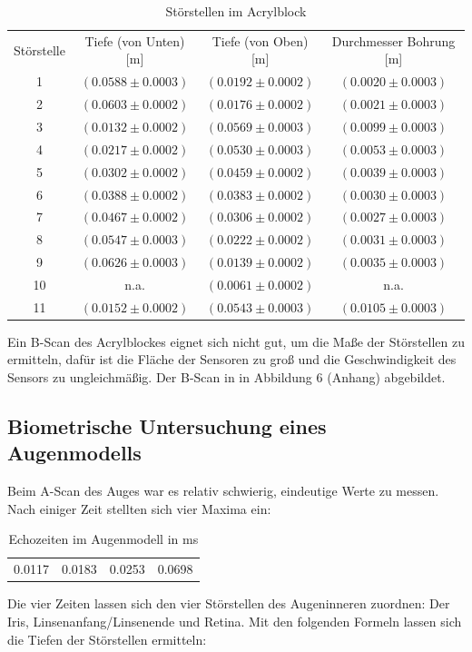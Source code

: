 \documentclass[11pt,ngerman,a4paper]{article}
\begin{document}
\begin{table}[h]
\centering
 \begin{tabular}{|c||c|c|c|}
Störstelle  & Tiefe (von Unten)[m] & Tiefe (von Oben)[m]& Durchmesser Bohrung [m] \\
1 & $(0.0588\pm0.0003)$ & $(0.0192\pm0.0002)$ & $(0.0020\pm0.0003)$ \\
2 & $(0.0603\pm0.0002)$ & $(0.0176\pm0.0002)$ & $(0.0021\pm0.0003)$ \\
3 & $(0.0132\pm0.0002)$ & $(0.0569\pm0.0003)$ & $(0.0099\pm0.0003)$ \\
4 & $(0.0217\pm0.0002)$ & $(0.0530\pm0.0003)$ & $(0.0053\pm0.0003)$ \\
5 & $(0.0302\pm0.0002)$ & $(0.0459\pm0.0002)$ & $(0.0039\pm0.0003)$ \\
6 & $(0.0388\pm0.0002)$ & $(0.0383\pm0.0002)$ & $(0.0030\pm0.0003)$ \\
7 & $(0.0467\pm0.0002)$ & $(0.0306\pm0.0002)$ & $(0.0027\pm0.0003)$ \\
8 & $(0.0547\pm0.0003)$ & $(0.0222\pm0.0002)$ & $(0.0031\pm0.0003)$ \\
9 & $(0.0626\pm0.0003)$ & $(0.0139\pm0.0002)$ & $(0.0035\pm0.0003)$ \\
10 & n.a. & $(0.0061\pm0.0002)$ & n.a. \\
11 & $(0.0152\pm0.0002)$ & $(0.0543\pm0.0003)$ & $(0.0105\pm0.0003)$ \\
 \end{tabular}
\caption{Störstellen im Acrylblock}
\end{table}
Ein B-Scan des Acrylblockes eignet sich nicht gut, um die Maße der Störstellen zu ermitteln, dafür ist die Fläche der Sensoren zu groß und die Geschwindigkeit des Sensors zu ungleichmäßig. Der B-Scan in in Abbildung 6 (Anhang) abgebildet.
\subsection{Biometrische Untersuchung eines Augenmodells}
Beim A-Scan des Auges war es relativ schwierig, eindeutige Werte zu messen. Nach einiger Zeit stellten sich vier Maxima ein:
\begin{table}[h]
\centering
 \begin{tabular}{|c|c|c|c|}
 0.0117 & 0.0183 & 0.0253 & 0.0698 \\
 \end{tabular}
\caption{Echozeiten im Augenmodell in ms}
\end{table}
\newline
Die vier Zeiten lassen sich den vier Störstellen des Augeninneren zuordnen: Der Iris, Linsenanfang/Linsenende und Retina. 
Mit den folgenden Formeln lassen sich die Tiefen der Störstellen ermitteln:
\end{document}
